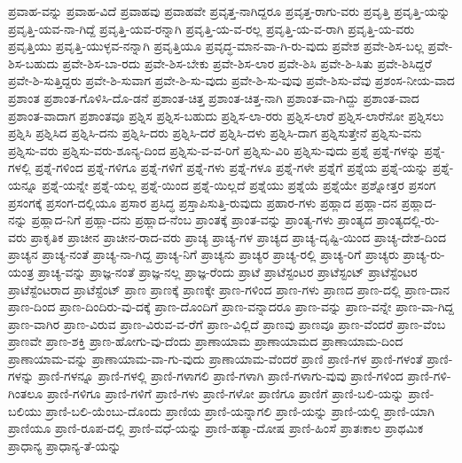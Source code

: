 {ಪ್ರವಾಹ-ವನ್ನು
ಪ್ರವಾಹ-ವಿದೆ
ಪ್ರವಾಹವು
ಪ್ರವಾಹವೇ
ಪ್ರವೃತ್ತ-ನಾಗಿದ್ದರೂ
ಪ್ರವೃತ್ತ-ರಾಗು-ವರು
ಪ್ರವೃತ್ತಿ
ಪ್ರವೃತ್ತಿ-ಯನ್ನು
ಪ್ರವೃತ್ತಿ-ಯವ-ನಾ-ಗಿದ್ದೆ
ಪ್ರವೃತ್ತಿ-ಯವ-ರನ್ನಾಗಿ
ಪ್ರವೃತ್ತಿ-ಯ-ವ-ರಲ್ಲ
ಪ್ರವೃತ್ತಿ-ಯ-ವ-ರಾಗಿ
ಪ್ರವೃತ್ತಿ-ಯ-ವರು
ಪ್ರವೃತ್ತಿಯು
ಪ್ರವೃತ್ತಿ-ಯುಳ್ಳವ-ನನ್ನಾಗಿ
ಪ್ರವೃತ್ತಿಯೂ
ಪ್ರವೃದ್ಧ-ಮಾನ-ವಾ-ಗಿ-ರು-ವುದು
ಪ್ರವೇಶ
ಪ್ರವೇ-ಶಿಸ-ಬಲ್ಲ
ಪ್ರವೇ-ಶಿಸ-ಬಹುದು
ಪ್ರವೇ-ಶಿಸ-ಬಾ-ರದು
ಪ್ರವೇ-ಶಿಸ-ಬೇಕು
ಪ್ರವೇ-ಶಿಸ-ಲಾರ
ಪ್ರವೇ-ಶಿಸಿ
ಪ್ರವೇ-ಶಿ-ಸಿತು
ಪ್ರವೇ-ಶಿಸಿದ್ದರೆ
ಪ್ರವೇ-ಶಿ-ಸುತ್ತಿದ್ದರು
ಪ್ರವೇ-ಶಿ-ಸುವಾಗ
ಪ್ರವೇ-ಶಿ-ಸು-ವುದು
ಪ್ರವೇ-ಶಿ-ಸು-ವುವು
ಪ್ರವೇ-ಶಿಸು-ವೆವು
ಪ್ರಶಂಸ-ನೀಯ-ವಾದ
ಪ್ರಶಾಂತ
ಪ್ರಶಾಂತ-ಗೊಳಿಸಿ-ದೊ-ಡನೆ
ಪ್ರಶಾಂತ-ಚಿತ್ತ
ಪ್ರಶಾಂತ-ಚಿತ್ತ-ನಾಗಿ
ಪ್ರಶಾಂತ-ವಾ-ಗಿದ್ದು
ಪ್ರಶಾಂತ-ವಾದ
ಪ್ರಶಾಂತ-ವಾದಾಗ
ಪ್ರಶಾಂತವೂ
ಪ್ರಶ್ನಿಸ
ಪ್ರಶ್ನಿಸ-ಬಹುದು
ಪ್ರಶ್ನಿಸ-ಲಾ-ರರು
ಪ್ರಶ್ನಿಸ-ಲಾರೆ
ಪ್ರಶ್ನಿಸ-ಲಾರೆನೋ
ಪ್ರಶ್ನಿಸಲು
ಪ್ರಶ್ನಿಸಿ
ಪ್ರಶ್ನಿಸಿದ
ಪ್ರಶ್ನಿಸಿ-ದನು
ಪ್ರಶ್ನಿಸಿ-ದರು
ಪ್ರಶ್ನಿಸಿ-ದರೆ
ಪ್ರಶ್ನಿಸಿ-ದಳು
ಪ್ರಶ್ನಿಸಿ-ದಾಗ
ಪ್ರಶ್ನಿಸುತ್ತೇನೆ
ಪ್ರಶ್ನಿಸು-ವನು
ಪ್ರಶ್ನಿಸು-ವರು
ಪ್ರಶ್ನಿಸು-ವರು-ಶೂನ್ಯ-ದಿಂದ
ಪ್ರಶ್ನಿಸು-ವ-ವ-ರಿಗೆ
ಪ್ರಶ್ನಿಸು-ವಿರಿ
ಪ್ರಶ್ನಿಸು-ವುದು
ಪ್ರಶ್ನೆ
ಪ್ರಶ್ನೆ-ಗಳನ್ನು
ಪ್ರಶ್ನೆ-ಗಳಲ್ಲಿ
ಪ್ರಶ್ನೆ-ಗಳಿಂದ
ಪ್ರಶ್ನೆ-ಗಳಿಗೂ
ಪ್ರಶ್ನೆ-ಗಳಿಗೆ
ಪ್ರಶ್ನೆ-ಗಳು
ಪ್ರಶ್ನೆ-ಗಳೂ
ಪ್ರಶ್ನೆ-ಗಳೇ
ಪ್ರಶ್ನೆಗೆ
ಪ್ರಶ್ನೆಯ
ಪ್ರಶ್ನೆ-ಯನ್ನು
ಪ್ರಶ್ನೆ-ಯನ್ನೂ
ಪ್ರಶ್ನೆ-ಯನ್ನೇ
ಪ್ರಶ್ನೆ-ಯಲ್ಲ
ಪ್ರಶ್ನೆ-ಯಿಂದ
ಪ್ರಶ್ನೆ-ಯಿಲ್ಲದೆ
ಪ್ರಶ್ನೆಯು
ಪ್ರಶ್ನೆಯೆ
ಪ್ರಶ್ನೆಯೇ
ಪ್ರಶ್ನೋತ್ತರ
ಪ್ರಸಂಗ
ಪ್ರಸಂಗಕ್ಕೆ
ಪ್ರಸಂಗ-ದಲ್ಲಿಯೂ
ಪ್ರಸಾರ
ಪ್ರಸಿದ್ಧ
ಪ್ರಸ್ತಾಪಿಸುತ್ತಿ-ರುವುದು
ಪ್ರಹಾರ-ಗಳು
ಪ್ರಹ್ಲಾದ
ಪ್ರಹ್ಲಾ-ದನ
ಪ್ರಹ್ಲಾದ-ನನ್ನು
ಪ್ರಹ್ಲಾದ-ನಿಗೆ
ಪ್ರಹ್ಲಾ-ದನು
ಪ್ರಹ್ಲಾದ-ನೆಂಬ
ಪ್ರಾಂತಕ್ಕೆ
ಪ್ರಾಂತ-ವನ್ನು
ಪ್ರಾಂತ್ಯ-ಗಳು
ಪ್ರಾಂತ್ಯದ
ಪ್ರಾಂತ್ಯದಲ್ಲಿ-ರು-ವರು
ಪ್ರಾಕೃತಿಕ
ಪ್ರಾಚೀನ
ಪ್ರಾಚೀನ-ರಾದ-ವರು
ಪ್ರಾಚ್ಯ
ಪ್ರಾಚ್ಯ-ಗಳ
ಪ್ರಾಚ್ಯದ
ಪ್ರಾಚ್ಯ-ದೃಷ್ಟಿ-ಯಿಂದ
ಪ್ರಾಚ್ಯ-ದೇಶ-ದಿಂದ
ಪ್ರಾಚ್ಯನ
ಪ್ರಾಚ್ಯ-ನಂತೆ
ಪ್ರಾಚ್ಯ-ನಾ-ಗಿದ್ದ
ಪ್ರಾಚ್ಯ-ನಿಗೆ
ಪ್ರಾಚ್ಯನು
ಪ್ರಾಚ್ಯರ
ಪ್ರಾಚ್ಯ-ರಲ್ಲಿ
ಪ್ರಾಚ್ಯ-ರಿಗೆ
ಪ್ರಾಚ್ಯರು
ಪ್ರಾಚ್ಯ-ರು-ಯಂತ್ರ
ಪ್ರಾಚ್ಯ-ವನ್ನು
ಪ್ರಾಜ್ಞ-ನಂತೆ
ಪ್ರಾಜ್ಞ-ನಲ್ಲ
ಪ್ರಾಜ್ಞ-ರೆಂದು
ಪ್ರಾಟೆ
ಪ್ರಾಟೆಸ್ಟಂಟರ
ಪ್ರಾಟೆಸ್ಟಂಟ್
ಪ್ರಾಟೆಸ್ಟೆಂಟರ
ಪ್ರಾಟೆಸ್ಟೆಂಟರಾದ
ಪ್ರಾಟೆಸ್ಟೆಂಟ್
ಪ್ರಾಣ
ಪ್ರಾಣಕ್ಕೆ
ಪ್ರಾಣಕ್ಕೇ
ಪ್ರಾಣ-ಗಳಿಂದ
ಪ್ರಾಣ-ಗಳು
ಪ್ರಾಣದ
ಪ್ರಾಣ-ದಲ್ಲಿ
ಪ್ರಾಣ-ದಾನ
ಪ್ರಾಣ-ದಿಂದ
ಪ್ರಾಣ-ದಿಂದಿರು-ವು-ದಕ್ಕೆ
ಪ್ರಾಣ-ದೊಂದಿಗೆ
ಪ್ರಾಣ-ವನ್ನಾದರೂ
ಪ್ರಾಣ-ವನ್ನು
ಪ್ರಾಣ-ವನ್ನೇ
ಪ್ರಾಣ-ವಾ-ಗಿದ್ದ
ಪ್ರಾಣ-ವಾಗಿರ
ಪ್ರಾಣ-ವಿರುವ
ಪ್ರಾಣ-ವಿರುವ-ವ-ರೆಗೆ
ಪ್ರಾಣ-ವಿಲ್ಲಿದೆ
ಪ್ರಾಣವು
ಪ್ರಾಣವೂ
ಪ್ರಾಣ-ವೆಂದರೆ
ಪ್ರಾಣ-ವೆಂಬ
ಪ್ರಾಣವೇ
ಪ್ರಾಣ-ಶಕ್ತಿ
ಪ್ರಾಣ-ಹೋಗು-ವು-ದೆಂದು
ಪ್ರಾಣಾಯಾಮ
ಪ್ರಾಣಾಯಾಮದ
ಪ್ರಾಣಾಯಾಮ-ದಿಂದ
ಪ್ರಾಣಾಯಾಮ-ವನ್ನು
ಪ್ರಾಣಾಯಾಮ-ವಾ-ಗು-ವುದು
ಪ್ರಾಣಾಯಾಮ-ವೆಂದರೆ
ಪ್ರಾಣಿ
ಪ್ರಾಣಿ-ಗಳ
ಪ್ರಾಣಿ-ಗಳಂತೆ
ಪ್ರಾಣಿ-ಗಳನ್ನು
ಪ್ರಾಣಿ-ಗಳನ್ನೂ
ಪ್ರಾಣಿ-ಗಳಲ್ಲಿ
ಪ್ರಾಣಿ-ಗಳಾಗಲಿ
ಪ್ರಾಣಿ-ಗಳಾಗಿ
ಪ್ರಾಣಿ-ಗಳಾಗು-ವುವು
ಪ್ರಾಣಿ-ಗಳಿಂದ
ಪ್ರಾಣಿ-ಗಳಿ-ಗಿಂತಲೂ
ಪ್ರಾಣಿ-ಗಳಿಗೂ
ಪ್ರಾಣಿ-ಗಳಿಗೆ
ಪ್ರಾಣಿ-ಗಳು
ಪ್ರಾಣಿ-ಗಳೋ
ಪ್ರಾಣಿಗೂ
ಪ್ರಾಣಿಗೆ
ಪ್ರಾಣಿ-ಬಲಿ-ಯನ್ನು
ಪ್ರಾಣಿ-ಬಲಿಯು
ಪ್ರಾಣಿ-ಬಲಿ-ಯೆಂಬು-ದೊಂದು
ಪ್ರಾಣಿಯ
ಪ್ರಾಣಿ-ಯನ್ನಾಗಲಿ
ಪ್ರಾಣಿ-ಯನ್ನು
ಪ್ರಾಣಿ-ಯಲ್ಲಿ
ಪ್ರಾಣಿ-ಯಾಗಿ
ಪ್ರಾಣಿಯೂ
ಪ್ರಾಣಿ-ರೂಪ-ದಲ್ಲಿ
ಪ್ರಾಣಿ-ವಧೆ-ಯನ್ನು
ಪ್ರಾಣಿ-ಹತ್ಯಾ-ದೋಷ
ಪ್ರಾಣಿ-ಹಿಂಸೆ
ಪ್ರಾತಃಕಾಲ
ಪ್ರಾಥಮಿಕ
ಪ್ರಾಧಾನ್ಯ
ಪ್ರಾಧಾನ್ಯ-ತೆ-ಯನ್ನು
}
